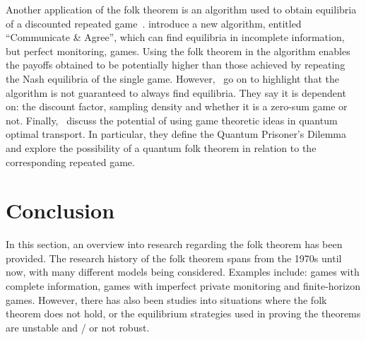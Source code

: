 Another application of the folk theorem is an algorithm used to obtain
equilibria of a discounted repeated game~\cite{Parras2020}. \cite{Parras2020}
introduce a new algorithm, entitled ``Communicate \& Agree'', which can find
equilibria in incomplete information, but perfect monitoring, games. Using the
folk theorem in the algorithm enables the payoffs obtained to be potentially
higher than those achieved by repeating the Nash equilibria of the single game.
However,~\cite{Parras2020} go on to highlight that the algorithm is not
guaranteed to always find equilibria. They say it is dependent on: the discount
factor, sampling density and whether it is a zero-sum game or not.
Finally,~\cite{Ikeda2020} discuss the potential of using game theoretic ideas in
quantum optimal transport. In particular, they define the Quantum Prisoner's
Dilemma and explore the possibility of a quantum folk theorem in relation to the
corresponding repeated game.


\section{Conclusion}\label{sec:Conclusion}
In this section, an overview into research regarding the folk theorem has been
provided. The research history of the folk theorem spans from the 1970s until
now, with many different models being considered. Examples include: games with
complete information, games with imperfect private monitoring and finite-horizon
games. However, there has also been studies into situations where the folk
theorem does not hold, or the equilibrium strategies used in proving the
theorems are unstable and / or not robust. 